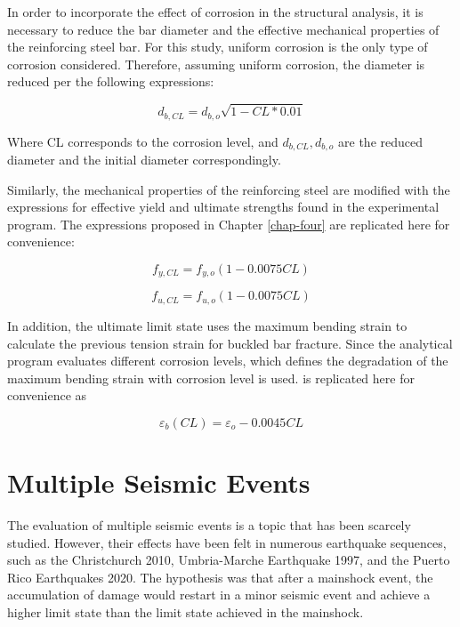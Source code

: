 In order to incorporate the effect of corrosion in the structural analysis, it is necessary to reduce the bar diameter and the effective mechanical properties of the reinforcing steel bar. For this study, uniform corrosion is the only type of corrosion considered. Therefore, assuming uniform corrosion, the diameter is reduced per the following expressions:

\begin{equation}
    d_{b,CL} = d_{b,o} \sqrt{1 - CL*0.01}
    \label{eq:d_eff}
\end{equation}

Where CL corresponds to the corrosion level, and $d_{b,CL}, d_{b,o}$ are the reduced diameter and the initial diameter correspondingly. 

Similarly, the mechanical properties of the reinforcing steel are modified with the expressions for effective yield and ultimate strengths found in the experimental program. The expressions proposed in Chapter \ref{chap-four} are replicated here for convenience:

\begin{equation}
    f_{y,CL} = f_{y,o}(1-0.0075CL)
    \label{eq.Calderon_Fy_vs_CL_5}
\end{equation}

\begin{equation}
    f_{u,CL} = f_{u,o}(1-0.0075CL)
    \label{eq.Calderon_Fu_vs_CL_5}
\end{equation}

In addition, the ultimate limit state uses the maximum bending strain to calculate the previous tension strain for buckled bar fracture. Since the analytical program evaluates different corrosion levels,  which defines the degradation of the maximum bending strain with corrosion level is used.  is replicated here for convenience as 

\begin{equation}
    \varepsilon_{b}(CL) = \varepsilon_{o}-0.0045CL
    \label{eq.Calderon_eb_vs_CL_02}
\end{equation}

\section{Multiple Seismic Events}

The evaluation of multiple seismic events is a topic that has been scarcely studied. However, their effects have been felt in numerous earthquake sequences, such as the Christchurch 2010, Umbria-Marche Earthquake 1997, and the Puerto Rico Earthquakes 2020. The hypothesis was that after a mainshock event, the accumulation of damage would restart in a minor seismic event and achieve a higher limit state than the limit state achieved in the mainshock.

